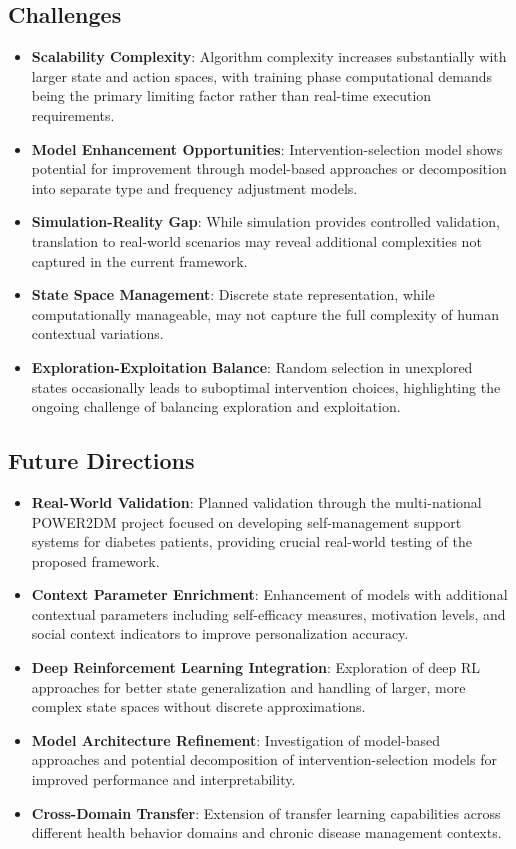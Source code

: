 \subsection*{Challenges}
\begin{itemize}
    \item \textbf{Scalability Complexity}: Algorithm complexity increases substantially with larger state and action spaces, with training phase computational demands being the primary limiting factor rather than real-time execution requirements.
    \item \textbf{Model Enhancement Opportunities}: Intervention-selection model shows potential for improvement through model-based approaches or decomposition into separate type and frequency adjustment models.
    \item \textbf{Simulation-Reality Gap}: While simulation provides controlled validation, translation to real-world scenarios may reveal additional complexities not captured in the current framework.
    \item \textbf{State Space Management}: Discrete state representation, while computationally manageable, may not capture the full complexity of human contextual variations.
    \item \textbf{Exploration-Exploitation Balance}: Random selection in unexplored states occasionally leads to suboptimal intervention choices, highlighting the ongoing challenge of balancing exploration and exploitation.
\end{itemize}

\subsection*{Future Directions}
\begin{itemize}
    \item \textbf{Real-World Validation}: Planned validation through the multi-national POWER2DM project focused on developing self-management support systems for diabetes patients, providing crucial real-world testing of the proposed framework.
    \item \textbf{Context Parameter Enrichment}: Enhancement of models with additional contextual parameters including self-efficacy measures, motivation levels, and social context indicators to improve personalization accuracy.
    \item \textbf{Deep Reinforcement Learning Integration}: Exploration of deep RL approaches for better state generalization and handling of larger, more complex state spaces without discrete approximations.
    \item \textbf{Model Architecture Refinement}: Investigation of model-based approaches and potential decomposition of intervention-selection models for improved performance and interpretability.
    \item \textbf{Cross-Domain Transfer}: Extension of transfer learning capabilities across different health behavior domains and chronic disease management contexts.
\end{itemize}

